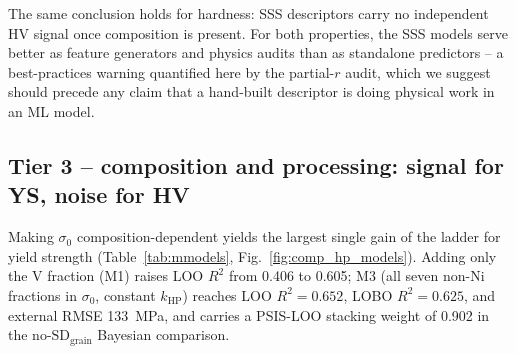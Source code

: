 \documentclass[5p,times,twocolumn]{elsarticle}
\begin{document}
The same conclusion holds for hardness: SSS descriptors carry no independent HV signal once composition is present. For both properties, the SSS models serve better as feature generators and physics audits than as standalone predictors -- a best-practices warning quantified here by the partial-$r$ audit, which we suggest should precede any claim that a hand-built descriptor is doing physical work in an ML model.

\subsection{Tier 3 -- composition and processing: signal for YS, noise for HV}
\label{sec:tier3}

Making $\sigma_0$ composition-dependent yields the largest single gain of the ladder for yield strength (Table~\ref{tab:mmodels}, Fig.~\ref{fig:comp_hp_models}). Adding only the V fraction (M1) raises LOO $R^2$ from 0.406 to 0.605; M3 (all seven non-Ni fractions in $\sigma_0$, constant $k_\text{HP}$) reaches LOO $R^2 = 0.652$, LOBO $R^2 = 0.625$, and external RMSE 133~\si{MPa}, and carries a PSIS-LOO stacking weight of 0.902 in the no-$\text{SD}_\text{grain}$ Bayesian comparison.
\end{document}
